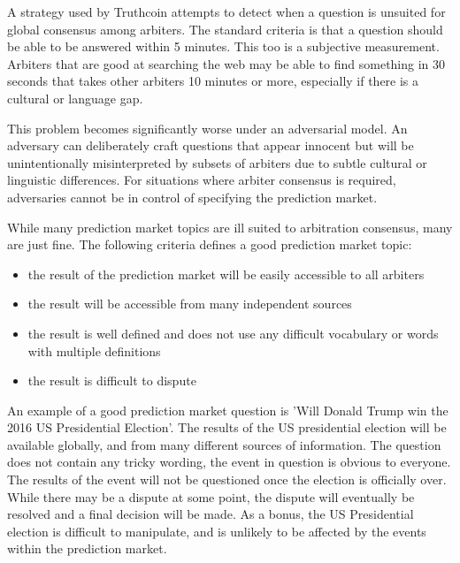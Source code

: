 \documentclass[onecolumn]{article}
\begin{document}
\begin{appendices}
A strategy used by Truthcoin \cite{truthcoin} attempts to detect when a question is unsuited for global consensus among arbiters.
The standard criteria is that a question should be able to be answered within 5 minutes.
This too is a subjective measurement.
Arbiters that are good at searching the web may be able to find something in 30 seconds that takes other arbiters 10 minutes or more, especially if there is a cultural or language gap.

This problem becomes significantly worse under an adversarial model.
An adversary can deliberately craft questions that appear innocent but will be unintentionally misinterpreted by subsets of arbiters due to subtle cultural or linguistic differences.
For situations where arbiter consensus is required, adversaries cannot be in control of specifying the prediction market.

While many prediction market topics are ill suited to arbitration consensus, many are just fine.
The following criteria defines a good prediction market topic:
\begin{itemize}
	\item the result of the prediction market will be easily accessible to all arbiters
	\item the result will be accessible from many independent sources
	\item the result is well defined and does not use any difficult vocabulary or words with multiple definitions
	\item the result is difficult to dispute
\end{itemize}

An example of a good prediction market question is 'Will Donald Trump win the 2016 US Presidential Election'.
The results of the US presidential election will be available globally, and from many different sources of information.
The question does not contain any tricky wording, the event in question is obvious to everyone.
The results of the event will not be questioned once the election is officially over.
While there may be a dispute at some point, the dispute will eventually be resolved and a final decision will be made.
As a bonus, the US Presidential election is difficult to manipulate, and is unlikely to be affected by the events within the prediction market.

\end{appendices}
\end{document}
